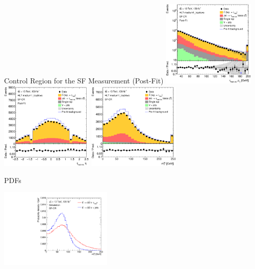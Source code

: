 \documentclass[11pt, xcolor={dvipsnames}, aspectratio=169, notes]{beamer}
\begin{document}
\begin{frame}{Control Region for the SF Measurement (Post-Fit)}
  \includegraphics[width=0.33\textwidth]{ttbarSF/postfit_sfcr/PTVR_postFit}%
  \includegraphics[width=0.33\textwidth]{ttbarSF/postfit_sfcr/ETAVR_postFit}%
  \includegraphics[width=0.33\textwidth]{ttbarSF/postfit_sfcr/MTWVR_postFit}
\end{frame}


\begin{frame}{\allbold{\mtw} PDFs}
  \centering

  \includegraphics[width=0.4\textwidth]{ttbarSF/mtw_pdf}
\end{frame}

\end{document}

